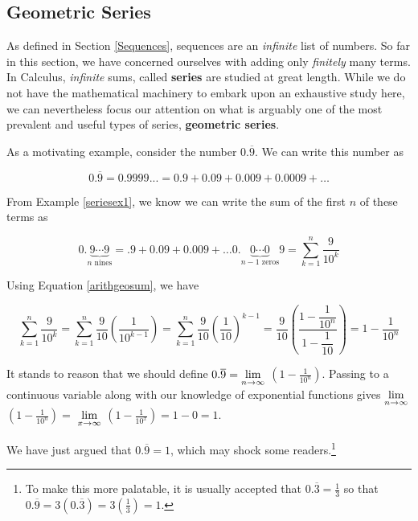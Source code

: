 \documentclass{ximera}
\begin{document}
\subsection{Geometric Series}
\label{GeometricSeries}

As defined in Section \ref{Sequences}, sequences are an \textit{infinite} list of numbers.  So far in this section, we have concerned ourselves with adding only \textit{finitely} many terms.   In Calculus,  \textit{infinite} sums, called \textbf{series} are studied at great length.  While we do not have the mathematical machinery to embark upon an exhaustive study here, we can nevertheless focus our attention on what is arguably one of the most prevalent and useful types of series, \textbf{geometric series}.

As a motivating example, consider the number $0.\overline{9}$.  We can write this number as

\[ 0.\overline{9} = 0.9999... = 0.9 + 0.09 + 0.009 + 0.0009 + \ldots \]


From Example \ref{seriesex1}, we know we can write the sum of the first $n$ of these terms as 

\[ 0.\underbrace{9 \cdots 9}_{\text{$n$ nines}} = .9 + 0.09 + 0.009 + \ldots 0.\! \! \! \! \underbrace{0 \cdots 0}_{\text{$n-1$ zeros}} \! \! \! \! 9 = \displaystyle{\sum_{k=1}^{n} \dfrac{9}{10^{k}}} \]

Using Equation \ref{arithgeosum}, we have


\[\displaystyle{\sum_{k=1}^{n} \dfrac{9}{10^{k}}} = \sum_{k=1}^{n} \dfrac{9}{10} \left(\dfrac{1}{10^{k-1}}\right) = \sum_{k=1}^{n} \dfrac{9}{10} \left(\dfrac{1}{10}\right)^{k-1} =  \dfrac{9}{10} \left( \dfrac{1 - \dfrac{1}{10^{n}}}{1 - \dfrac{1}{10}} \right) = 1 - \dfrac{1}{10^{n}}   \]

It stands to reason that we should define $0.\overline{9} = \ds{\lim_{n \rightarrow \infty}}$ $\left(1 - \frac{1}{10^{n}}\right)$.  Passing to a continuous variable along with our knowledge of exponential functions  gives  $\ds{\lim_{n \rightarrow \infty}}$ $\left(1 - \frac{1}{10^{n}} \right) =$ $\ds{\lim_{x \rightarrow \infty}}$ $\left(1 - \frac{1}{10^{x}} \right) = 1 - 0 = 1$.

\medskip

We have just argued that $0.\overline{9} = 1$, which may shock some readers.\footnote{To make this more palatable, it is usually accepted that $0.\overline{3} = \frac{1}{3}$ so that $0.\overline{9} = 3\left(0.\overline{3}\right) = 3\left(\frac{1}{3} \right) = 1$.}  
\end{document}
